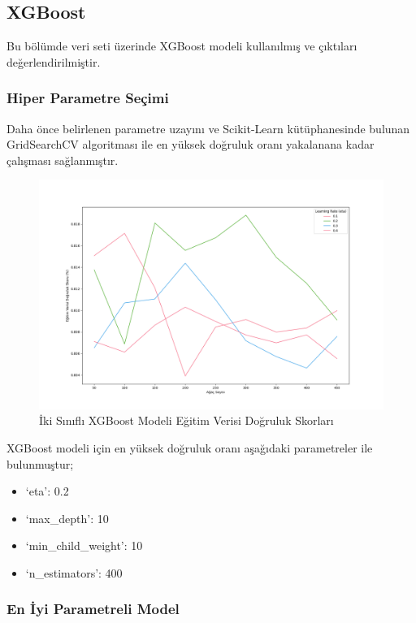 \documentclass[12pt,twoside]{deuthesis}
\providecommand{\tightlist}{%
  \setlength{\itemsep}{0pt}\setlength{\parskip}{0pt}}
\begin{document}
\hypertarget{bin_xgb}{%
\subsection{XGBoost}\label{bin_xgb}}

Bu bölümde veri seti üzerinde XGBoost modeli kullanılmış ve çıktıları değerlendirilmiştir.

\hypertarget{hiper-parametre-seuxe7imi-6}{%
\subsubsection{Hiper Parametre Seçimi}\label{hiper-parametre-seuxe7imi-6}}

Daha önce belirlenen parametre uzayını ve Scikit-Learn kütüphanesinde bulunan GridSearchCV algoritması ile en yüksek doğruluk oranı yakalanana kadar çalışması sağlanmıştır.
\begin{figure}

{\centering \includegraphics[width=1.1\linewidth,height=0.55\textheight]{figure/XGB_bin_Grid_Graph} 

}

\caption{İki Sınıflı XGBoost Modeli Eğitim Verisi Doğruluk Skorları}\label{fig:unnamed-chunk-70}
\end{figure}
XGBoost modeli için en yüksek doğruluk oranı aşağıdaki parametreler ile bulunmuştur;
\begin{itemize}
\tightlist
\item
  `eta': 0.2\\
\item
  `max\_depth': 10\\
\item
  `min\_child\_weight': 10\\
\item
  `n\_estimators': 400\\
  \newpage  
\end{itemize}
\hypertarget{en-iyi-parametreli-model-4}{%
\subsubsection{En İyi Parametreli Model}\label{en-iyi-parametreli-model-4}}
\end{document}
